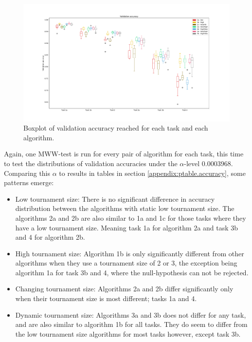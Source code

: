 \begin{figure}[p!]
    \includegraphics[width=1.2\textwidth, center]{Chapters/4.Experiments/exp2/figures/validation_boxplot.pdf}
    \caption{Boxplot of validation accuracy reached for each task and each algorithm.}
    \label{fig:search.validation}
\end{figure}

Again, one MWW-test is run for every pair of algorithm for each task, this time to test the distributions of validation accuracies under the \(\alpha\)-level 0.0003968. Comparing this \(\alpha\) to results in tables in section \ref{appendix:ptable.accuracy}, some patterns emerge: 
\begin{itemize}
    \item Low tournament size: There is no significant difference in accuracy distribution between the algorithms with static low tournament size. The algorithms 2a and 2b are also similar to 1a and 1c for those tasks where they have a low tournament size. Meaning task 1a for algorithm 2a and task 3b and 4 for algorithm 2b. 
    \item High tournament size: Algorithm 1b is only significantly different from other algorithms when they use a tournament size of 2 or 3, the exception being algorithm 1a for task 3b and 4, where the null-hypothesis can not be rejected. 
    \item Changing tournament size: Algorithms 2a and 2b differ significantly only when their tournament size is most different; tasks 1a and 4. 
    \item Dynamic tournament size: Algorithms 3a and 3b does not differ for any task, and are also similar to algorithm 1b for all tasks. They do seem to differ from the low tournament size algorithms for most tasks however, except task 3b. 
\end{itemize}

